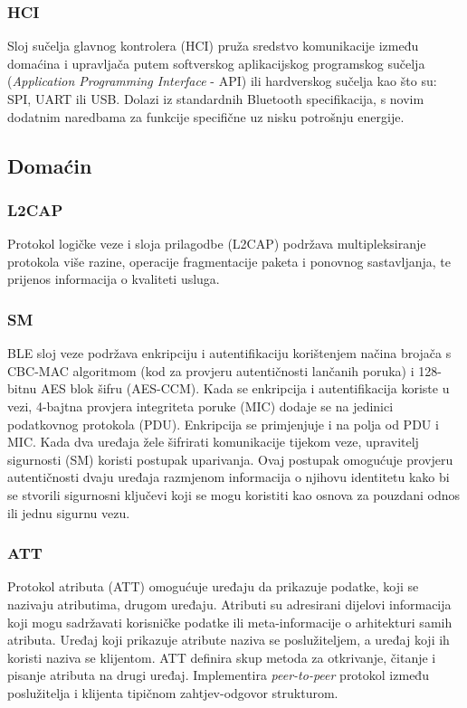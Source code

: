 \subsubsection{HCI}
Sloj sučelja glavnog kontrolera (HCI) pruža sredstvo komunikacije između domaćina i upravljača  putem softverskog aplikacijskog programskog sučelja (\textit{Application Programming Interface} - API) ili hardverskog sučelja kao što su: SPI, UART ili USB. Dolazi iz standardnih Bluetooth specifikacija, s novim dodatnim naredbama za funkcije specifične uz nisku potrošnju energije.

\subsection{Domaćin}

\subsubsection{L2CAP}
Protokol logičke veze i sloja prilagodbe (L2CAP) podržava multipleksiranje protokola više razine, operacije fragmentacije paketa i ponovnog sastavljanja, te prijenos informacija o kvaliteti usluga.

\subsubsection{SM}
BLE sloj veze podržava enkripciju i autentifikaciju korištenjem načina brojača s CBC-MAC algoritmom (kod za provjeru autentičnosti lančanih poruka) i 128-bitnu AES blok šifru (AES-CCM). Kada se enkripcija i autentifikacija koriste u vezi, 4-bajtna provjera integriteta poruke (MIC) dodaje se na jedinici podatkovnog protokola (PDU). Enkripcija se primjenjuje i na polja od PDU i MIC. Kada dva uređaja žele šifrirati komunikacije tijekom veze, upravitelj sigurnosti (SM) koristi postupak uparivanja. Ovaj postupak omogućuje provjeru autentičnosti dvaju uređaja razmjenom informacija o njihovu identitetu kako bi se stvorili sigurnosni ključevi koji se mogu koristiti kao osnova za pouzdani odnos ili jednu sigurnu vezu. 

\subsubsection{ATT}
Protokol atributa (ATT) omogućuje uređaju da prikazuje podatke, koji se nazivaju atributima, drugom uređaju. Atributi su adresirani dijelovi informacija koji mogu sadržavati korisničke podatke ili meta-informacije o arhitekturi samih atributa. Uređaj koji prikazuje atribute naziva se poslužiteljem, a uređaj koji ih koristi naziva se klijentom. 
ATT definira skup metoda za otkrivanje, čitanje i pisanje atributa na drugi uređaj. Implementira \textit{peer-to-peer} protokol između poslužitelja i klijenta tipičnom zahtjev-odgovor strukturom. 


